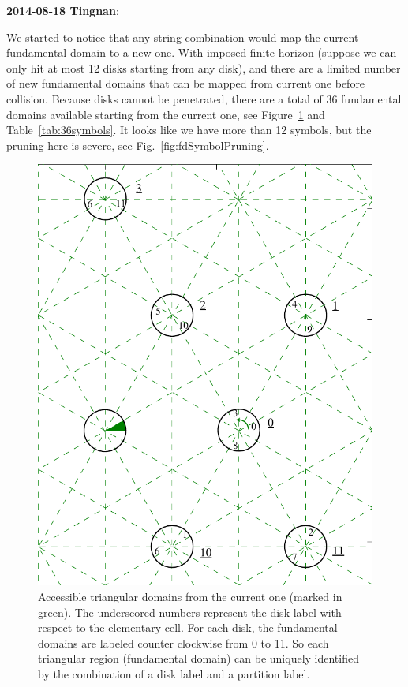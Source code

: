 {\bf 2014-08-18 Tingnan}:

We started to notice that any string combination would map the current fundamental domain to a new one. With imposed finite horizon (suppose we can only hit at most 12 disks starting from any disk), and there are a limited number of new fundamental domains that can be mapped from current one before collision. Because disks cannot be penetrated, there are a total of 36 fundamental domains available starting from the current one, see Figure~\ref{fig:36symbols} and Table~\ref{tab:36symbols}. It looks like we have more than 12 symbols, but the pruning here is severe, see Fig.~\ref{fig:fdSymbolPruning}.
\begin{figure}
\includegraphics{fdSymbolIllustration}
\caption{Accessible triangular domains from the current one (marked in green). The underscored numbers represent the disk label with respect to the elementary cell. For each disk, the fundamental domains are labeled counter clockwise from 0 to 11. So each triangular region (fundamental domain) can be uniquely identified by the combination of a disk label and a partition label.}
\label{fig:36symbols}
\end{figure}
